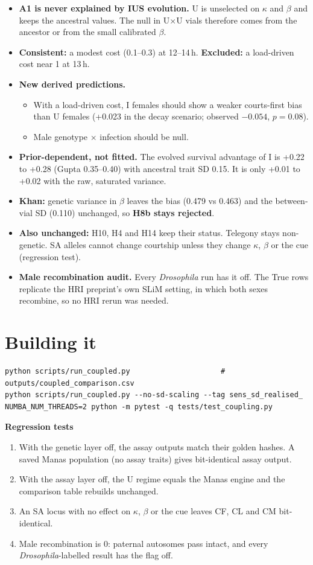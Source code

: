 \begin{itemize}
\item \textbf{A1 is never explained by IUS evolution.} U is unselected on $\kappa$ and $\beta$ and keeps the ancestral values. The null in U$\times$U vials therefore comes from the ancestor or from the small calibrated $\beta$.
\item \textbf{Consistent:} a modest cost (0.1--0.3) at 12--14\,h. \textbf{Excluded:} a load-driven cost near 1 at 13\,h.
\item \textbf{New derived predictions.}
  \begin{itemize}
  \item With a load-driven cost, I females should show a weaker courts-first bias than U females (+0.023 in the decay scenario; observed $-0.054$, $p=0.08$).
  \item Male genotype $\times$ infection should be null.
  \end{itemize}
\item \textbf{Prior-dependent, not fitted.} The evolved survival advantage of I is +0.22 to +0.28 (Gupta 0.35--0.40) with ancestral trait SD 0.15. It is only +0.01 to +0.02 with the raw, saturated variance.
\item \textbf{Khan:} genetic variance in $\beta$ leaves the bias (0.479 vs 0.463) and the between-vial SD (0.110) unchanged, so \textbf{H8b stays rejected}.
\item \textbf{Also unchanged:} H10, H4 and H14 keep their status. Telegony stays non-genetic. SA alleles cannot change courtship unless they change $\kappa$, $\beta$ or the cue (regression test).
\item \textbf{Male recombination audit.} Every \emph{Drosophila} run has it off. The True rows replicate the HRI preprint's own SLiM setting, in which both sexes recombine, so no HRI rerun was needed.
\end{itemize}

\section{Building it}
\begin{lstlisting}[style=sh]
python scripts/run_coupled.py                     # outputs/coupled_comparison.csv
python scripts/run_coupled.py --no-sd-scaling --tag sens_sd_realised_
NUMBA_NUM_THREADS=2 python -m pytest -q tests/test_coupling.py
\end{lstlisting}
\textbf{Regression tests}
\begin{enumerate}
\item With the genetic layer off, the assay outputs match their golden hashes. A saved Manas population (no assay traits) gives bit-identical assay output.
\item With the assay layer off, the U regime equals the Manas engine and the comparison table rebuilds unchanged.
\item An SA locus with no effect on $\kappa$, $\beta$ or the cue leaves CF, CL and CM bit-identical.
\item Male recombination is 0: paternal autosomes pass intact, and every \emph{Drosophila}-labelled result has the flag off.
\end{enumerate}
